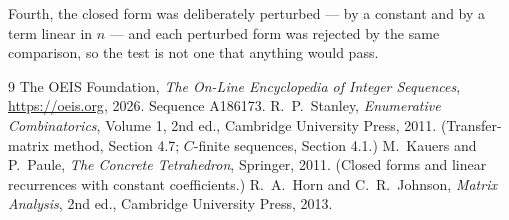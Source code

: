 \documentclass[11pt,a4paper]{article}
\theoremstyle{plain}
\theoremstyle{definition}
\begin{document}
Fourth, the closed form was deliberately perturbed --- by a constant and by a term linear in
$n$ --- and each perturbed form was rejected by the same comparison, so the test is not one
that anything would pass.

\begin{thebibliography}{9}
 The OEIS Foundation, \emph{The On-Line Encyclopedia of Integer
Sequences}, \url{https://oeis.org}, 2026. Sequence A186173.
 R.~P.~Stanley, \emph{Enumerative Combinatorics}, Volume 1, 2nd ed.,
Cambridge University Press, 2011. (Transfer-matrix method, Section 4.7; $C$-finite sequences,
Section 4.1.)
 M.~Kauers and P.~Paule, \emph{The Concrete Tetrahedron}, Springer, 2011.
(Closed forms and linear recurrences with constant coefficients.)
 R.~A.~Horn and C.~R.~Johnson, \emph{Matrix Analysis}, 2nd ed., Cambridge
University Press, 2013.
\end{thebibliography}
\end{document}
